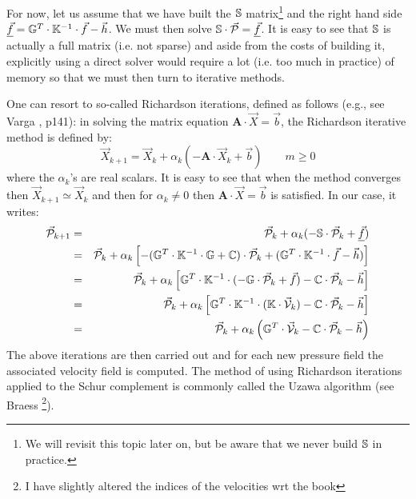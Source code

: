 For now, let us assume that we have built the ${\mathbb{S}}$ matrix\footnote{We will 
revisit this topic later on, but be aware that we never build ${\mathbb{S}}$ in practice.} 
and the right hand 
side $\underline{\vec{f}}={\mathbb{G}}^T \cdot {\mathbb{K}}^{-1} \cdot \vec{f} - \vec{h}$.
We must then solve ${\mathbb{S}}\cdot \vec{\cal P} = \underline{\vec{f}}$.
It is easy to see that ${\mathbb{S}}$ is actually a full matrix (i.e. not sparse) and 
aside from the costs of building it, explicitly using a direct solver would require 
a lot (i.e. too much in practice) of memory so that we must then turn to iterative methods. 

One can resort to so-called Richardson iterations, defined as follows 
(e.g., see Varga \cite{varga}, p141):
in solving the matrix equation ${\bm A}\cdot {\vec X}={\vec b}$,
the Richardson iterative method is defined by: 
\begin{equation}
{\vec X}_{k+1} = {\vec X}_k + \alpha_k (-{\bm A} \cdot {\vec X}_k + {\vec b})
\quad\quad
m\geq 0 
\end{equation}
where the $\alpha_k$'s are real scalars. 
It is easy to see that when the method converges then ${\vec X}_{k+1} \simeq {\vec X}_k$  and then 
for $\alpha_k\neq 0$ then ${\bm A}\cdot {\vec X}={\vec b}$ is satisfied. 
In our case, it writes:
\begin{eqnarray}
\vec {\cal P}_{k+1} 
&=& \vec {\cal P}_{k} + \alpha_k ( - {\mathbb{S}} \cdot \vec{\cal P}_{k}  +  \underline{\vec{f}}) \nonumber\\
&=& \vec {\cal P}_{k} + \alpha_k \left[ - ({\mathbb{G}}^T \cdot {\mathbb{K}}^{-1} \cdot {\mathbb{G}} + {\mathbb{C}})  \cdot \vec{\cal P}_{k} 
+  ({\mathbb{G}}^T \cdot {\mathbb{K}}^{-1} \cdot \vec{f} - \vec{h}   ) \right] \nonumber\\
&=& \vec {\cal P}_{k} + \alpha_k \left[ {\mathbb{G}}^T \cdot {\mathbb{K}}^{-1} \cdot ( - {\mathbb{G}} \cdot \vec{\cal P}_{k} + \vec{f}) 
-{\mathbb{C}} \cdot \vec{\cal P}_{k} - \vec{h} 
\right] \nonumber\\
&=& \vec {\cal P}_{k} + \alpha_k \left[ {\mathbb{G}}^T \cdot {\mathbb{K}}^{-1} \cdot ( {\mathbb{K}}\cdot \vec{\cal V}_k)
-{\mathbb{C}} \cdot \vec{\cal P}_{k}  - \vec{h} \right] \nonumber\\
&=& \vec {\cal P}_{k} + \alpha_k \left( {\mathbb{G}}^T \cdot \vec{\cal V}_k -{\mathbb{C}} \cdot \vec{\cal P}_{k} - \vec{h} \right) 
\end{eqnarray}
The above iterations are then carried out and for each new pressure field the associated velocity field 
is computed. The method of using Richardson iterations applied to the Schur complement 
is commonly called the Uzawa algorithm (see Braess \cite[p221]{braess}
\footnote{I have slightly 
altered the indices of the velocities wrt the book}).


